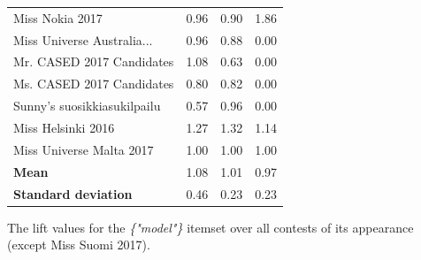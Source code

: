 \documentclass[english]{tktltiki}
\begin{document}
\begin{table}[H]
\begin{adjustbox}{width=1\textwidth}
\begin{tabular}{lccc}
                                   Miss Nokia 2017 &  0.96 &  0.90 &    1.86 \\
                        Miss Universe Australia... &  0.96 &  0.88 &    0.00 \\
                         Mr. CASED 2017 Candidates &  1.08 &  0.63 &    0.00 \\
                         Ms. CASED 2017 Candidates &  0.80 &  0.82 &    0.00 \\
                       Sunny's suosikkiasukilpailu &  0.57 &  0.96 &    0.00 \\
                                Miss Helsinki 2016 &  1.27 &  1.32 &    1.14 \\
                          Miss Universe Malta 2017 &  1.00 &  1.00 &    1.00 \\
        \bottomrule
        \textbf{Mean} & 1.08 & 1.01 & 0.97 \\
        \textbf{Standard deviation} & 0.46 & 0.23 & 0.23
    \end{tabular}
    \end{adjustbox}
    The lift values for the \emph{\{"model"\}} itemset over all contests of its appearance (except Miss Suomi 2017).
    \label{model_itemset_lift_observations}
\end{table}
\end{document}
